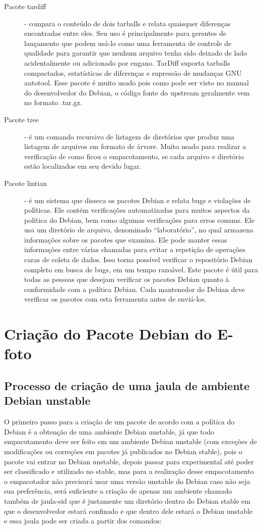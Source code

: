 \begin{description}
	\item[Pacote tardiff] - compara o conteúdo de dois tarballs e relata quaisquer diferenças encontradas entre eles. Seu uso é principalmente para gerentes de lançamento que podem usá-lo como uma ferramenta de controle de qualidade para garantir que nenhum arquivo tenha sido deixado de lado acidentalmente ou adicionado por engano. TarDiff suporta tarballs compactados, estatísticas de diferenças e supressão de mudanças GNU autotool. Esse pacote é muito usado pois como pode ser visto no manual do desenvolvedor do Debian, o código fonte do upstream geralmente vem no formato .tar.gz.
	\item[Pacote tree] - é um comando recursivo de listagem de diretórios que produz uma listagem de arquivos em formato de árvore. Muito usado para realizar a verificação de como ficou o empacotamento, se cada arquivo e diretório estão localizados em seu devido lugar.
	\item[Pacote lintian] - é um sistema que disseca os pacotes Debian e relata bugs e violações de políticas. Ele contém verificações automatizadas para muitos aspectos da política do Debian, bem como algumas verificações para erros comuns. Ele usa um diretório de arquivo, denominado “laboratório”, no qual armazena informações sobre os pacotes que examina. Ele pode manter essas informações entre várias chamadas para evitar a repetição de operações caras de coleta de dados. Isso torna possível verificar o repositório Debian completo em busca de bugs, em um tempo razoável. Este pacote é útil para todas as pessoas que desejam verificar os pacotes Debian quanto à conformidade com a política Debian. Cada mantenedor do Debian deve verificar os pacotes com esta ferramenta antes de enviá-los.
\end{description}
 
\section{Criação do Pacote Debian do E-foto}

\subsection{Processo de criação de uma jaula de ambiente Debian unstable}

O primeiro passo para a criação de um pacote de acordo com a política do Debian é a obtenção de uma ambiente Debian unstable, já que todo empacotamento deve ser feito em um ambiente Debian unstable (com exceções de modificações ou correções em pacotes já publicados no Debian stable), pois o pacote vai entrar no Debian unstable, depois passar para experimental até poder ser classificado e utilizado no stable, mas para a realização desse empacotamento o empacotador não precisará usar uma versão unstable do Debian caso não seja sua preferência, será suficiente a criação de apenas um ambiente chamado também de jaula-sid que é justamente um diretório dentro do Debian stable em que o desenvolvedor estará confinado e que dentro dele estará o Debian unstable e essa jaula pode ser criada a partir dos comandos: 

